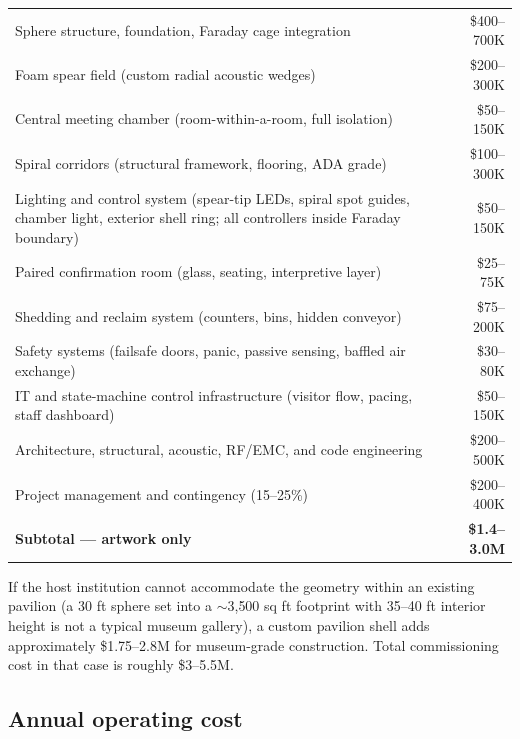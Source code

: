 \documentclass[10pt, letterpaper]{article}
\begin{document}
\begin{metricbox}
\begin{tabularx}{\textwidth}{@{} X r @{}}
Sphere structure, foundation, Faraday cage integration & \$400--700K \\
Foam spear field (custom radial acoustic wedges) & \$200--300K \\
Central meeting chamber (room-within-a-room, full isolation) & \$50--150K \\
Spiral corridors (structural framework, flooring, ADA grade) & \$100--300K \\
Lighting and control system (spear-tip LEDs, spiral spot guides, chamber light, exterior shell ring; all controllers inside Faraday boundary) & \$50--150K \\
Paired confirmation room (glass, seating, interpretive layer) & \$25--75K \\
Shedding and reclaim system (counters, bins, hidden conveyor) & \$75--200K \\
Safety systems (failsafe doors, panic, passive sensing, baffled air exchange) & \$30--80K \\
IT and state-machine control infrastructure (visitor flow, pacing, staff dashboard) & \$50--150K \\
Architecture, structural, acoustic, RF/EMC, and code engineering & \$200--500K \\
Project management and contingency (15--25\%) & \$200--400K \\
\midrule
\textbf{Subtotal --- artwork only} & \textbf{\$1.4--3.0M} \\
\end{tabularx}
\end{metricbox}

If the host institution cannot accommodate the geometry within an existing pavilion (a 30 ft sphere set into a $\sim$3{,}500 sq ft footprint with 35--40 ft interior height is not a typical museum gallery), a custom pavilion shell adds approximately \$1.75--2.8M for museum-grade construction. Total commissioning cost in that case is roughly \$3--5.5M.

\subsection{Annual operating cost}
\end{document}
